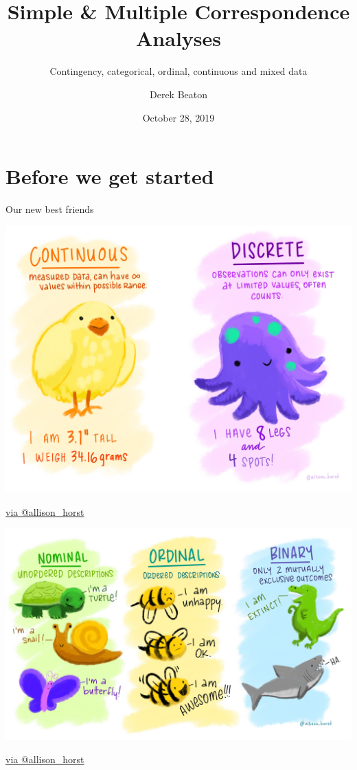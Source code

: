 \documentclass[
  ignorenonframetext,
]{beamer}
\title{Simple \& Multiple Correspondence Analyses}
\subtitle{Contingency, categorical, ordinal, continuous and mixed data}
\author{Derek Beaton}
\date{October 28, 2019}
\institute{Rotman Research Institute}
\begin{document}
\frame{\titlepage}

\hypertarget{before-we-get-started}{%
\section{Before we get started}\label{before-we-get-started}}

\begin{frame}{Our new best friends}
\protect\hypertarget{our-new-best-friends}{}

\includegraphics[width=\textwidth,height=0.75\textheight]{../images/cont_disc.jpg}

\href{https://twitter.com/allison_horst}{via @allison\_horst}

\end{frame}

\begin{frame}

\includegraphics[width=\textwidth,height=0.75\textheight]{../images/nom_ord_bin.jpg}

\href{https://twitter.com/allison_horst}{via @allison\_horst}

\end{frame}
\end{document}
